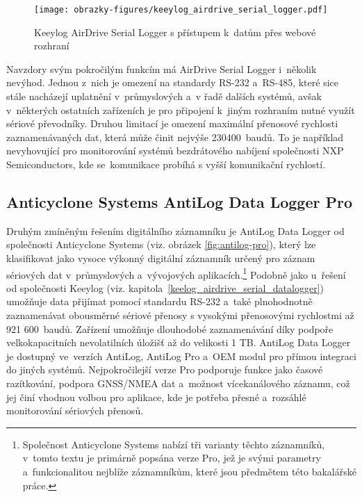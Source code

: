 \newpage

\begin{figure}[h]
    \centering
    \texttt{[image: obrazky-figures/keeylog\_airdrive\_serial\_logger.pdf]}
    
    \caption{Keeylog AirDrive Serial Logger s přístupem k~datům přes webové rozhraní~\cite{keelog_airdrive_serial_datalogger_scheme, keelog_airdrive_serial_datalogger}}
    \label{fig:keelog-airdrive-serial-datalogger}
\end{figure}

Navzdory svým pokročilým funkcím má AirDrive Serial Logger i~několik nevýhod. Jednou z~nich je omezení na standardy RS-232 a~RS-485, které sice stále nacházejí uplatnění v~průmyslových a~v řadě dalších systémů, avšak v~některých ostatních zařízeních je pro připojení k~jiným rozhraním nutné využít sériové převodníky. Druhou limitací je omezení maximální přenosové rychlosti zaznamenávaných dat, která může činit nejvýše 230400~baudů. To je například nevyhovující pro monitorování systémů bezdrátového nabíjení společnosti NXP Semiconductors, kde se~komunikace probíhá s vyšší komunikační rychlostí.~\cite{keelog_airdrive_serial_datalogger}

\newpage

\subsection{Anticyclone Systems AntiLog Data Logger Pro}
\label{anticyclone_systems_antilog_data_logger}
Druhým zmíněným řešením digitálního záznamníku je AntiLog Data Logger od společnosti Anticyclone Systems (viz. obrázek \ref{fig:antilog-pro}), který lze klasifikovat jako vysoce výkonný digitální záznamník určený pro záznam sériových dat v~průmyslových a~vývojových aplikacích.\footnote{Společnost Anticyclone Systems nabízí tři varianty těchto záznamníků, v~tomto textu je primárně popsána verze Pro, jež je svými parametry a~funkcionalitou nejblíže záznamníkům, které jsou předmětem této bakalářské práce.} Podobně jako u~řešení od společnosti Keeylog (viz. kapitola~\ref{keelog_airdrive_serial_datalogger}) umožňuje data přijímat pomocí standardu RS-232 a~také plnohodnotně zaznamenávat obousměrné sériové přenosy s vysokými přenosovými rychlostmi až 921 600~baudů. Zařízení umožňuje dlouhodobé zaznamenávání díky podpoře velkokapacitních nevolatilních úložišť až do velikosti 1 TB. AntiLog Data Logger je dostupný ve~verzích AntiLog, AntiLog Pro a~OEM modul pro přímou integraci do jiných systémů. Nejpokročilejší verze Pro podporuje funkce jako časové razítkování, podpora GNSS/NMEA dat a~možnost vícekanálového záznamu, což jej činí vhodnou volbou pro aplikace, kde je potřeba přesné a~rozsáhlé monitorování sériových přenosů.~\cite{anticyclone_systems_antilog_pro}

